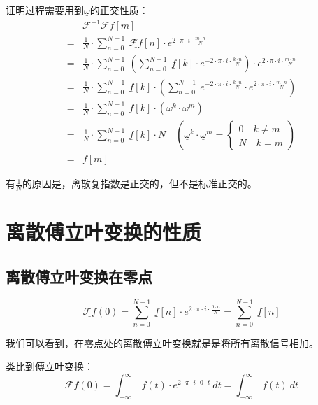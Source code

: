 证明过程需要用到$\underline{\omega}$的正交性质：
\begin{align*}
	  & \mathcal{F}^{-1}\mathcal{F}f[m]                                                                                                                                                              \\
	= & \frac{1}{N}\cdot \sum\limits_{n=0}^{N-1}\ \underline{\mathcal{F}f}[n]\cdot e^{2\cdot \pi\cdot i\cdot \frac{m\cdot n}{N}}                                                                     \\
	= & \frac{1}{N}\cdot \sum\limits_{n=0}^{N-1}\ (\sum\limits_{n=0}^{N-1}\ \underline{f}[k]\cdot e^{-2\cdot \pi\cdot i\cdot \frac{k\cdot n}{N}})\cdot e^{2\cdot \pi\cdot i\cdot \frac{m\cdot n}{N}} \\
	= & \frac{1}{N}\cdot \sum\limits_{n=0}^{N-1}\ \underline{f}[k]\cdot (\sum\limits_{n=0}^{N-1}\ e^{-2\cdot \pi\cdot i\cdot \frac{k\cdot n}{N}}\cdot e^{2\cdot \pi\cdot i\cdot \frac{m\cdot n}{N}}) \\
	= & \frac{1}{N}\cdot \sum\limits_{n=0}^{N-1}\ \underline{f}[k]\cdot(\underline{\omega}^k\cdot \underline{\omega}^m)                                                                              \\
	= & \frac{1}{N}\cdot \sum\limits_{n=0}^{N-1}\ \underline{f}[k]\cdot N\quad (\underline{\omega}^k\cdot \underline{\omega}^m=\begin{cases}
		0\quad k\neq m \\
		N\quad k=m
	\end{cases})                                           \\
	= & f[m]
\end{align*}

有$\frac{1}{N}$的原因是，离散复指数是正交的，但不是标准正交的。

\section{离散傅立叶变换的性质}
\subsection{离散傅立叶变换在零点}
$$
	\underline{\mathcal{F}f}(0)=\sum\limits_{n=0}^{N-1}\ \underline{f}[n]\cdot e^{2\cdot \pi\cdot i\cdot \frac{0\cdot n}{N}}=\sum\limits_{n=0}^{N-1}\ \underline{f}[n]
$$

我们可以看到，在零点处的离散傅立叶变换就是是将所有离散信号相加。

类比到傅立叶变换：
$$
	\mathcal{F}f(0)=\int_{-\infty}^\infty\ f(t)\cdot e^{2\cdot \pi\cdot i\cdot 0\cdot t}\ dt=\int_{-\infty}^\infty\ f(t)\ dt
$$
